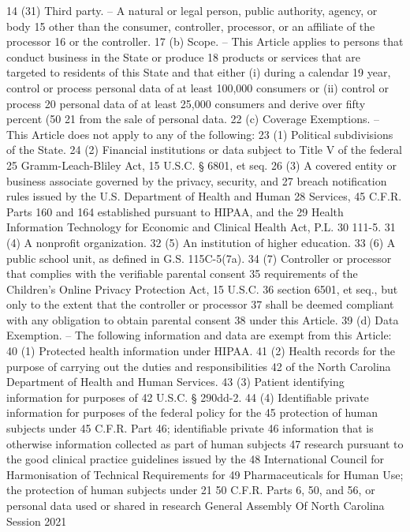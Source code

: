 14 (31) Third party. – A natural or legal person, public authority, agency, or body
15 other than the consumer, controller, processor, or an affiliate of the processor
16 or the controller.
17 (b) Scope. – This Article applies to persons that conduct business in the State or produce
18 products or services that are targeted to residents of this State and that either (i) during a calendar
19 year, control or process personal data of at least 100,000 consumers or (ii) control or process
20 personal data of at least 25,000 consumers and derive over fifty percent (50%
21 from the sale of personal data.
22 (c) Coverage Exemptions. – This Article does not apply to any of the following:
23 (1) Political subdivisions of the State.
24 (2) Financial institutions or data subject to Title V of the federal
25 Gramm-Leach-Bliley Act, 15 U.S.C. § 6801, et seq.
26 (3) A covered entity or business associate governed by the privacy, security, and
27 breach notification rules issued by the U.S. Department of Health and Human
28 Services, 45 C.F.R. Parts 160 and 164 established pursuant to HIPAA, and the
29 Health Information Technology for Economic and Clinical Health Act, P.L.
30 111-5.
31 (4) A nonprofit organization.
32 (5) An institution of higher education.
33 (6) A public school unit, as defined in G.S. 115C-5(7a).
34 (7) Controller or processor that complies with the verifiable parental consent
35 requirements of the Children's Online Privacy Protection Act, 15 U.S.C.
36 section 6501, et seq., but only to the extent that the controller or processor
37 shall be deemed compliant with any obligation to obtain parental consent
38 under this Article.
39 (d) Data Exemption. – The following information and data are exempt from this Article:
40 (1) Protected health information under HIPAA.
41 (2) Health records for the purpose of carrying out the duties and responsibilities
42 of the North Carolina Department of Health and Human Services.
43 (3) Patient identifying information for purposes of 42 U.S.C. § 290dd-2.
44 (4) Identifiable private information for purposes of the federal policy for the
45 protection of human subjects under 45 C.F.R. Part 46; identifiable private
46 information that is otherwise information collected as part of human subjects
47 research pursuant to the good clinical practice guidelines issued by the
48 International Council for Harmonisation of Technical Requirements for
49 Pharmaceuticals for Human Use; the protection of human subjects under 21
50 C.F.R. Parts 6, 50, and 56, or personal data used or shared in research 
General Assembly Of North Carolina Session 2021
